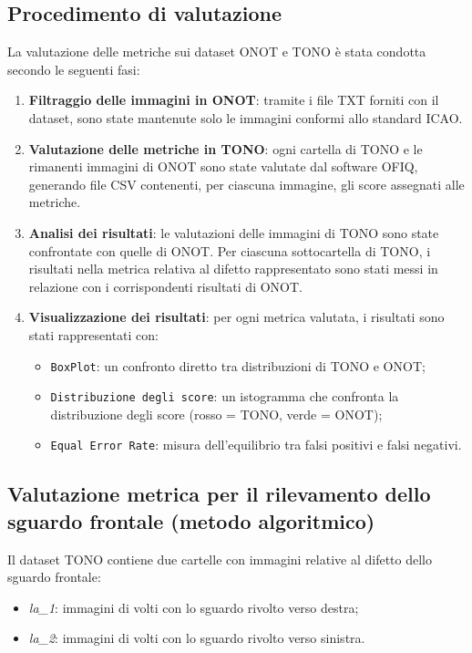 \documentclass[12pt,a4paper,openright,twoside]{book}
\begin{document}
\subsection{Procedimento di valutazione}
La valutazione delle metriche sui dataset ONOT e TONO è stata condotta secondo le seguenti fasi:
\begin{enumerate}
    \item \textbf{Filtraggio delle immagini in ONOT}: tramite i file TXT forniti con il dataset, sono state mantenute solo le immagini conformi allo standard ICAO.
    \item \textbf{Valutazione delle metriche in TONO}: ogni cartella di TONO e le rimanenti immagini di ONOT sono state valutate dal software OFIQ, generando file CSV contenenti, per ciascuna immagine, gli score assegnati alle metriche.
    \item \textbf{Analisi dei risultati}: le valutazioni delle immagini di TONO sono state confrontate con quelle di ONOT. Per ciascuna sottocartella di TONO, i risultati nella metrica relativa al difetto rappresentato sono stati messi in relazione con i corrispondenti risultati di ONOT.
    \item \textbf{Visualizzazione dei risultati}: per ogni metrica valutata, i risultati sono stati rappresentati con:
    \begin{itemize}
        \item \texttt{BoxPlot}: un confronto diretto tra distribuzioni di TONO e ONOT;
        \item \texttt{Distribuzione degli score}: un istogramma che confronta la distribuzione degli score (rosso = TONO, verde = ONOT);
        \item \texttt{Equal Error Rate}: misura dell'equilibrio tra falsi positivi e falsi negativi.
    \end{itemize}
\end{enumerate}

\subsection{Valutazione metrica per il rilevamento dello sguardo frontale (metodo algoritmico)}
\label{chap:evalutazione_frontal_gaze_algo}
Il dataset TONO contiene due cartelle con immagini relative al difetto dello sguardo frontale:
\begin{itemize}
    \item \textit{la\_1}: immagini di volti con lo sguardo rivolto verso destra;
    \item \textit{la\_2}: immagini di volti con lo sguardo rivolto verso sinistra.
\end{itemize}
\end{document}
